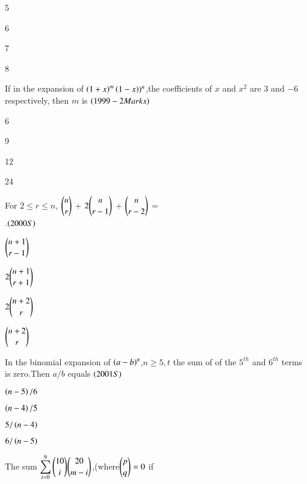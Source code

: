 \documentclass[journal,12pt,twocolumn]{IEEEtran}
\theoremstyle{remark}
\begin{document}
\begin{enumerate}
{\begin{enumerate}[label=(\alph*)]
\begin{multicols}{2}
    \item 5
    \item 6
    \item 7
    \item 8
    \end{multicols}
\end{enumerate}
\item If in the expansion of $\left(1+x\right)^m\left(1-x\right))^n$,the coefficients of $x$ and $x^2$ are $3$ and $-6$ respectively, then $m$ is
{\hfill$\left(1999-2Marks\right)$}\\
\begin{enumerate}[label=(\alph*)]
\begin{multicols}{2}
    \item 6
    \item 9
    \item 12
    \item 24
    \end{multicols}
\end{enumerate}
\item For $2\leq r\leq n$, $\dbinom{n}{r}$ + $2\dbinom{n}{r-1}$ + $\dbinom{n}{r-2}$ =\\.\hfill{$\left(2000S\right)$}
\begin{enumerate}[label=(\alph*)]\begin{multicols}{2} 
    \item $\dbinom{n+1}{r-1}$ \\\item $2\dbinom{n+1}{r+1}$
    \item $2\dbinom{n+2}{r}$ \\ \item $\dbinom{n+2}{r}$
    \end{multicols}
\end{enumerate}
\item In the binomial expansion of $\left(a-b\right)^n$,$n\geq 5,t$ the sum of of the $5^{th}$ and $6^{th}$ terms is zero.Then $a/b$  equals
{\hfill $\left(2001S\right)$}
\begin{enumerate}[label=(\alph*)]
\begin{multicols}{2}
    \item $\left(n-5\right)/6$
    \item $\left(n-4\right)/5$
    \item $5/\left(n-4\right)$
    \item $6/\left(n-5\right)$
 \end{multicols}   
\end{enumerate}
\item The sum $\displaystyle\sum_{i=0}^{9} \dbinom{10}{i}\dbinom{20}{m-i}$,(where$\dbinom{p}{q}=0$ if {
}}
\end{enumerate}
\end{document}
